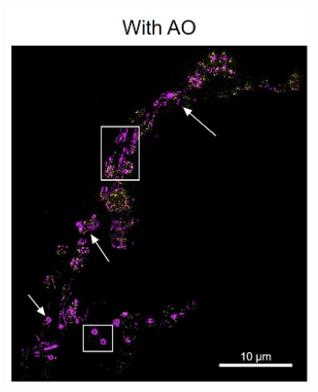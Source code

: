 \begin{figure}
\begin{subfigure}[t]{0.49\textwidth}
		\includegraphics[width=\linewidth]{images/DeepSIM_NMJ_AO.jpg}
		\caption{}
		\label{fig:DeepSIM_NMJ_AO}
	\end{subfigure}
	

\end{figure}
